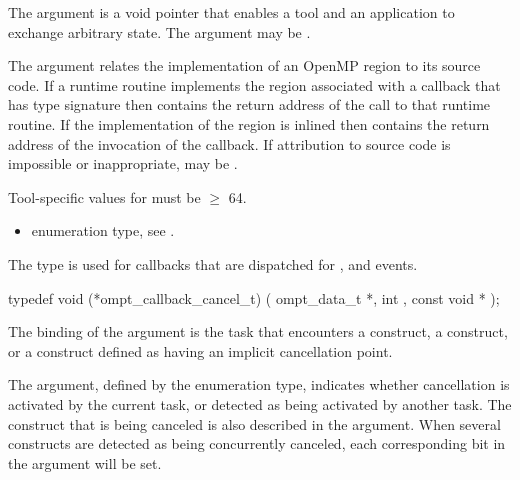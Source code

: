 The  argument is a void pointer that enables a tool and an application 
to exchange arbitrary state. The  argument may be .

The  argument relates the implementation of an OpenMP region
to its source code. If a runtime routine implements the region associated with
a callback that has type signature  then
 contains the return address of the call to that runtime routine.
If the implementation of the region is inlined then  contains the
return address of the invocation of the callback. If attribution to source code
is impossible or inappropriate, may be .

\constraints
Tool-specific values for  must be $\geq$ 64.

\crossreferences
\begin{itemize}
\item {} enumeration type, see .
\end{itemize}



\label{sec:ompt_callback_cancel_t}

\summary
The  type is used for callbacks that are 
dispatched for ,  and  events.

\format
\begin{ccppspecific}
\begin{omptCallback}
typedef void (*ompt_callback_cancel_t) (
  ompt_data_t *,
  int ,
  const void *
);
\end{omptCallback}
\end{ccppspecific}

\argdesc
The binding of the  argument is the task that encounters a 
 construct, a  construct, or a construct 
defined as having an implicit cancellation point.

The  argument, defined by the  enumeration
type, indicates whether cancellation is activated by the current task, or detected 
as being activated by another task. The construct that is being canceled is also 
described in the  argument. When several constructs are detected as being
concurrently canceled, each corresponding bit in the argument will be set.

